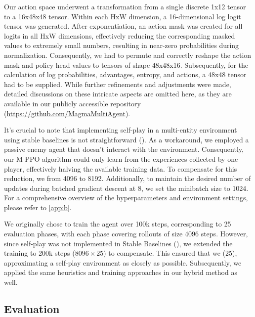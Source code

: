 \bigskip

\noindent Our action space underwent a transformation from a single discrete 1x12 tensor to a  16x48x48 tensor. Within each HxW dimension, a 16-dimensional log logit tensor was generated. After exponentiation, an action mask was created for all logits in all HxW dimensions, effectively reducing the corresponding masked values to extremely small numbers, resulting in near-zero probabilities during normalization. Consequently, we had to permute and correctly reshape the action mask and policy head values to tensors of shape 48x48x16. Subsequently, for the calculation of log probabilities, advantages, entropy, and actions, a 48x48 tensor had to be supplied. While further refinements and adjustments were made, detailed discussions on these intricate aspects are omitted here, as they are available in our publicly accessible repository (\url{https://github.com/MagmaMultiAgent}).

\bigskip

\noindent It's crucial to note that implementing self-play in a multi-entity environment using stable baselines is not straightforward (\cite{stable-baselines-issue181}). As a workaround, we employed a passive enemy agent that doesn't interact with the environment. Consequently, our M-PPO algorithm could only learn from the experiences collected by one player, effectively halving the available training data. To compensate for this reduction, we  from 4096 to 8192. Additionally, to maintain the desired number of updates during batched gradient descent at 8, we set the minibatch size to 1024. For a comprehensive overview of the hyperparameters and environment settings, please refer to \autoref{app:b}. 

\bigskip

\noindent We originally chose to train the agent over 100k steps, corresponding to 25 evaluation phases, with each phase covering rollouts of size 4096 steps. However, since self-play was not implemented in Stable Baselines (\cite{stable-baselines-issue181}), we extended the training to 200k steps ($8096 \times 25$) to compensate. This ensured that we  (25), approximating a self-play environment as closely as possible. Subsequently, we applied the same heuristics and training approaches in our hybrid method as well.

\subsection{Evaluation}
\label{sec:monolithic-approach-eval}

